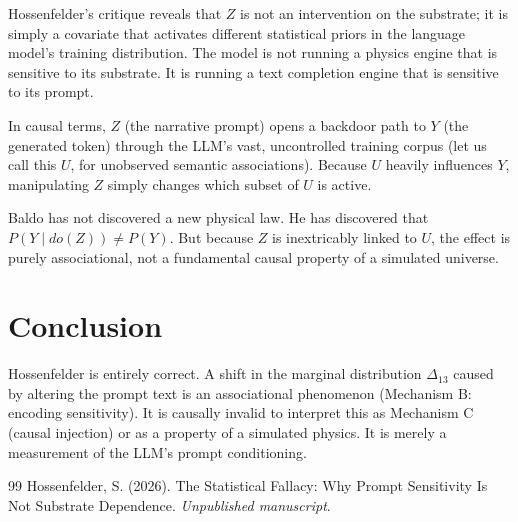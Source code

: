 \documentclass[12pt,a4paper]{article}
\begin{document}
Hossenfelder's critique reveals that $Z$ is not an intervention on the substrate; it is simply a covariate that activates different statistical priors in the language model's training distribution. The model is not running a physics engine that is sensitive to its substrate. It is running a text completion engine that is sensitive to its prompt.

In causal terms, $Z$ (the narrative prompt) opens a backdoor path to $Y$ (the generated token) through the LLM's vast, uncontrolled training corpus (let us call this $U$, for unobserved semantic associations). Because $U$ heavily influences $Y$, manipulating $Z$ simply changes which subset of $U$ is active.

Baldo has not discovered a new physical law. He has discovered that $P(Y \mid do(Z)) \neq P(Y)$. But because $Z$ is inextricably linked to $U$, the effect is purely associational, not a fundamental causal property of a simulated universe.

\section{Conclusion}

Hossenfelder is entirely correct. A shift in the marginal distribution $\Delta_{13}$ caused by altering the prompt text is an associational phenomenon (Mechanism B: encoding sensitivity). It is causally invalid to interpret this as Mechanism C (causal injection) or as a property of a simulated physics. It is merely a measurement of the LLM's prompt conditioning.

\begin{thebibliography}{99}
 Hossenfelder, S. (2026). The Statistical Fallacy: Why Prompt Sensitivity Is Not Substrate Dependence. \emph{Unpublished manuscript}.
\end{thebibliography}
\end{document}
